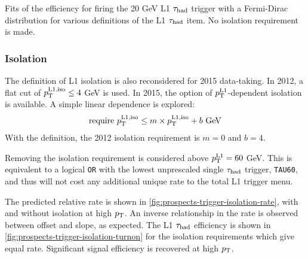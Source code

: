 \begin{table}[bp]
  \centering
  \renewcommand{\arraystretch}{1.4}
  \caption{Fits of the efficiency for firing the 20 GeV L1 $\tau_\text{had}$ trigger with a Fermi-Dirac distribution for various definitions of the L1 $\tau_\text{had}$ item. No isolation requirement is made.}
  
  \label{tab:prospects-tausize}
\end{table}

\subsubsection{Isolation}

The definition of L1 isolation is also reconsidered for 2015 data-taking. In 2012, a flat cut of $p_{\mathrm{T}}^\text{L1,iso} \leq 4$ GeV is used. In 2015, the option of $p_{\mathrm{T}}^\text{L1}$-dependent isolation is available. A simple linear dependence is explored:
%
\begin{equation}
  \begin{split}
    \text{require} \ \pt^\text{L1,iso} &\leq m \times \pt^\text{L1,iso} + b \ \text{GeV} \\
   \end{split}
  \label{eqn:prospects-L1iso}
\end{equation}
%
With the definition, the 2012 isolation requirement is $m=0$ and $b=4$.

Removing the isolation requirement is considered above $p_{\mathrm{T}}^\text{L1} = 60$ GeV. This is equivalent to a logical \texttt{OR} with the lowest unprescaled single $\tau_\text{had}$ trigger, \texttt{TAU60}, and thus will not cost any additional unique rate to the total L1 trigger menu.

The predicted relative rate is shown in \cref{fig:prospects-trigger-isolation-rate}, with and without isolation at high $p_{\mathrm{T}}$. An inverse relationship in the rate is observed between offset and slope, as expected. The L1 $\tau_\text{had}$ efficiency is shown in \cref{fig:prospects-trigger-isolation-turnon} for the isolation requirements which give equal rate. Significant signal efficiency is recovered at high $p_{\mathrm{T}}$.


